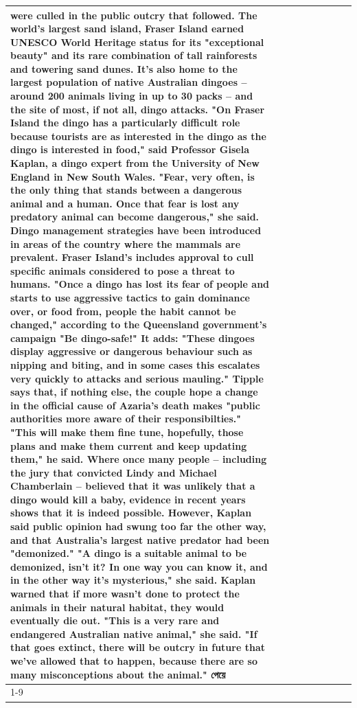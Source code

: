 \begin{table}[H]
\begin{tabular}{lllrlllll}
were culled in the public outcry that followed. The world's largest sand island, Fraser Island earned UNESCO World Heritage status for its "exceptional beauty" and its rare combination of tall rainforests and towering sand dunes. It's also home to the largest population of native Australian dingoes -- around 200 animals living in up to 30 packs -- and the site of most, if not all, dingo attacks. "On Fraser Island the dingo has a particularly difficult role because tourists are as interested in the dingo as the dingo is interested in food," said Professor Gisela Kaplan, a dingo expert from the University of New England in New South Wales. "Fear, very often, is the only thing that stands between a dangerous animal and a human. Once that fear is lost any predatory animal can become dangerous," she said. Dingo management strategies have been introduced in areas of the country where the mammals are prevalent. Fraser Island's includes approval to cull specific animals considered to pose a threat to humans. "Once a dingo has lost its fear of people and starts to use aggressive tactics to gain dominance over, or food from, people the habit cannot be changed," according to the Queensland government's campaign "Be dingo-safe!" It adds: "These dingoes display aggressive or dangerous behaviour such as nipping and biting, and in some cases this escalates very quickly to attacks and serious mauling." Tipple says that, if nothing else, the couple hope a change in the official cause of Azaria's death makes "public authorities more aware of their responsibilties." "This will make them fine tune, hopefully, those plans and make them current and keep updating them," he said. Where once many people -- including the jury that convicted Lindy and Michael Chamberlain -- believed that it was unlikely that a dingo would kill a baby, evidence in recent years shows that it is indeed possible. However, Kaplan said public opinion had swung too far the other way, and that Australia's largest native predator had been "demonized." "A dingo is a suitable animal to be demonized, isn't it? In one way you can know it, and in the other way it's mysterious," she said. Kaplan warned that if more wasn't done to protect the animals in their natural habitat, they would eventually die out. "This is a very rare and endangered Australian native animal," she said. "If that goes extinct, there will be outcry in future that we've allowed that to happen, because there are so many misconceptions about the animal." পেয়ে \\
\cline{1-9}

\end{tabular}
\end{table}
